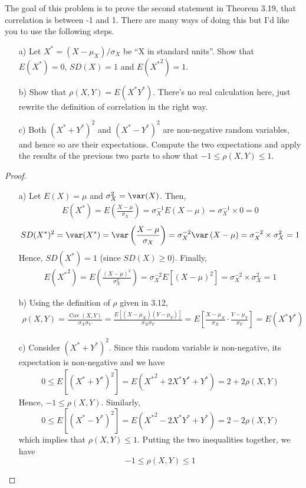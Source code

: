\documentclass[12pt,titlepage]{article}
\DeclareMathOperator{\Cov}{Cov}
\begin{document}
The goal of this problem is to prove the second statement in Theorem 3.19, that correlation is between -1 and 1. There are many ways of doing this but I'd like you to use the following steps.

\begin{enumerate}
\item[a)] Let $X^{*} = (X-\mu_{X})/\sigma_{X}$ be ``X in standard units''. Show that $E(X^{*}) = 0$, $SD(X) = 1$ and $E({X^{*}}^{2})=1$. 
\item[b)] Show that $\rho(X,Y) = E(X^{*}Y^{*})$. There's no real calculation here, just rewrite the definition of correlation in the right way.
\item[c)] Both $(X^{*}+Y^{*})^2$ and $(X^{*} - Y^{*})^{2}$ are non-negative random variables, and hence so are their expectations. Compute the two expectations and apply the results of the previous two parts to show that $-1\leq \rho(X,Y) \leq 1$. 
\end{enumerate}

\begin{proof}
\begin{enumerate}
\item[a)] Let $E(X) = \mu$ and $\sigma_{X}^{2} = \var(X)$. Then,
\begin{align*}
E(X^{*}) = E\left(\frac{X-\mu}{\sigma_{X}}\right) = \sigma_{X}^{-1}E(X-\mu) = \sigma_{X}^{-1} \times 0 = 0
\end{align*}
\begin{align*}
SD(X^{*})^2 = \var(X^{*}) = \var\left(\frac{X-\mu}{\sigma_{X}}\right) = \sigma_{X}^{-2}\var\left(X-\mu\right) = \sigma_{X}^{-2} \times \sigma_{X}^{2} = 1
\end{align*}
Hence, $SD(X^{*}) = 1$ (since $SD(X) \geq 0$). Finally, 
\begin{align*}
E({X^{*}}^{2}) = E\left( \frac{(X-\mu)^2}{\sigma_{X}^{2}} \right) = \sigma_{X}^{-2} E\left[ \left(X-\mu\right)^{2} \right] = \sigma_{X}^{-2} \times \sigma_{X}^{2} = 1
\end{align*}
\item[b)] Using the definition of $\rho$ given in 3.12,
\begin{align*}
\rho(X,Y) = \frac{\Cov(X,Y)}{\sigma_{X}\sigma_{Y}} = \frac{E\left[(X-\mu_{X})(Y-\mu_{Y})\right]}{\sigma_{X} \sigma_{Y}} = E\left[ \frac{X-\mu_{X}}{\sigma_{X}} \cdot \frac{Y-\mu_{Y}}{\sigma_{Y}} \right] = E(X^{*} Y^{*})
\end{align*}
\item[c)] Consider $(X^{*}+Y^{*})^2$. Since this random variable is non-negative, its expectation is non-negative and we have
\begin{align*}
0 \leq E\left[(X^{*}+Y^{*})^2 \right] = E({X^{*}}^{2} + 2X^{*}Y^{*} + Y^{*}) = 2 + 2\rho(X,Y) 
\end{align*}
Hence, $-1 \leq \rho(X,Y)$. Similarly, 
\[
0 \leq E\left[(X^{*}-Y^{*})^2 \right] = E({X^{*}}^{2} - 2X^{*}Y^{*} + Y^{*}) = 2 - 2\rho(X,Y) 
\]
which implies that $\rho(X,Y) \leq 1$. Putting the two inequalities together, we have
\[
-1 \leq \rho(X,Y) \leq 1
\]
\end{enumerate}
\end{proof}
\end{document}
